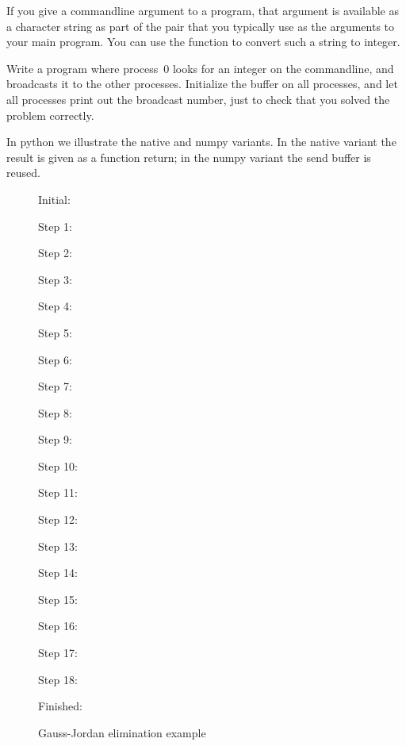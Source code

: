 
\begin{exercise}
  \label{ex:argv-bcast}
  If you give a commandline argument to a program, that argument is available
  as a character string as part of the  pair that you typically use
  as the arguments to your main program. You can use the function  to
  convert such a string to integer.

  Write a program where process~0 looks for an integer on the commandline, and
  broadcasts it to the other processes. Initialize the buffer on all processes, and
  let all processes print out the broadcast number,
  just to check that you solved the problem correctly.
\end{exercise}

In python we illustrate the native and numpy variants. In the native
variant the result is given as a function return; in the numpy variant
the send buffer is reused.
%

\begin{figure}[p]
  \tiny
  \begin{multicols}{3}
    Initial:\\ \nobreak
    
    Step 1:\\ \nobreak
    
    Step 2:\\ \nobreak
    
    Step 3:\\ \nobreak
    
    Step 4:\\ \nobreak
    
    Step 5:\\ \nobreak
    
    Step 6:\\ \nobreak
    
    Step 7:\\ \nobreak
    
    Step 8:\\ \nobreak
    
    Step 9:\\ \nobreak
    
    Step 10:\\ \nobreak
    
    Step 11:\\ \nobreak
    
    Step 12:\\ \nobreak
    
    Step 13:\\ \nobreak
    
    Step 14:\\ \nobreak
    
    Step 15:\\ \nobreak
    
    Step 16:\\ \nobreak
    
    Step 17:\\ \nobreak
    
    Step 18:\\ \nobreak
    
    Finished:\\ \nobreak
    
  \end{multicols}
  \caption{Gauss-Jordan elimination example}
  \label{fig:gauss-jordan-ex}
\end{figure}

